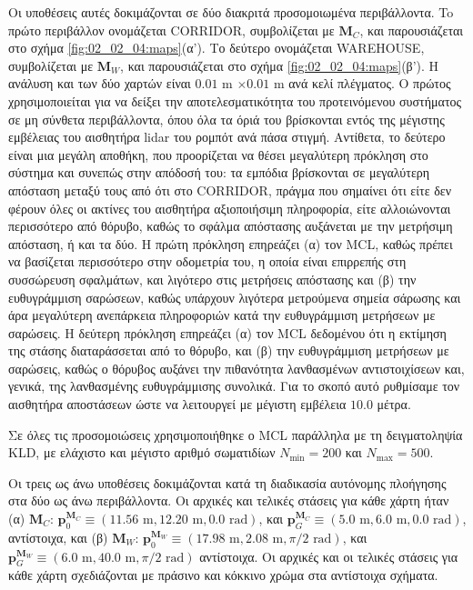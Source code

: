 Οι υποθέσεις αυτές δοκιμάζονται σε δύο διακριτά προσομοιωμένα περιβάλλοντα. To
πρώτο περιβάλλον ονομάζεται CORRIDOR, συμβολίζεται με $\bm{M}_C$, και
παρουσιάζεται στο σχήμα \ref{fig:02_02_04:maps}(α'). Το δεύτερο ονομάζεται
WAREHOUSE, συμβολίζεται με $\bm{M}_W$, και παρουσιάζεται στο σχήμα
\ref{fig:02_02_04:maps}(β'). Η ανάλυση και των δύο χαρτών είναι $0.01$ m
$\times0.01$ m ανά κελί πλέγματος. Ο πρώτος χρησιμοποιείται για να δείξει την
αποτελεσματικότητα του προτεινόμενου συστήματος σε μη σύνθετα περιβάλλοντα,
όπου όλα τα όριά του βρίσκονται εντός της μέγιστης εμβέλειας του αισθητήρα
lidar του ρομπότ ανά πάσα στιγμή.  Αντίθετα, το δεύτερο είναι μια μεγάλη
αποθήκη, που προορίζεται να θέσει μεγαλύτερη πρόκληση στο σύστημα και συνεπώς
στην απόδοσή του: τα εμπόδια βρίσκονται σε μεγαλύτερη απόσταση μεταξύ τους από
ότι στο CORRIDOR, πράγμα που σημαίνει ότι είτε δεν φέρουν όλες οι ακτίνες του
αισθητήρα αξιοποιήσιμη πληροφορία, είτε αλλοιώνονται περισσότερο από θόρυβο,
καθώς το σφάλμα απόστασης αυξάνεται με την μετρήσιμη απόσταση, ή και τα δύο. Η
πρώτη πρόκληση επηρεάζει (α) τον MCL, καθώς πρέπει να βασίζεται περισσότερο
στην οδομετρία του, η οποία είναι επιρρεπής στη συσσώρευση σφαλμάτων, και
λιγότερο στις μετρήσεις απόστασης και (β) την ευθυγράμμιση σαρώσεων, καθώς
υπάρχουν λιγότερα μετρούμενα σημεία σάρωσης και άρα μεγαλύτερη ανεπάρκεια
πληροφοριών κατά την ευθυγράμμιση μετρήσεων με σαρώσεις. Η δεύτερη πρόκληση
επηρεάζει (α) τον MCL δεδομένου ότι η εκτίμηση της στάσης διαταράσσεται από το
θόρυβο, και (β) την ευθυγράμμιση μετρήσεων με σαρώσεις, καθώς ο θόρυβος αυξάνει
την πιθανότητα λανθασμένων αντιστοιχίσεων και, γενικά, της λανθασμένης
ευθυγράμμισης συνολικά. Για το σκοπό αυτό ρυθμίσαμε τον αισθητήρα αποστάσεων
ώστε να λειτουργεί με μέγιστη εμβέλεια $10.0$ μέτρα.

Σε όλες τις προσομοιώσεις χρησιμοποιήθηκε ο MCL παράλληλα με τη δειγματοληψία
KLD, με ελάχιστο και μέγιστο αριθμό σωματιδίων $N_{\min}=200$ και
$N_{\max}=500$.

Οι τρεις ως άνω υποθέσεις δοκιμάζονται κατά τη διαδικασία αυτόνομης πλοήγησης
στα δύο ως άνω περιβάλλοντα. Οι αρχικές και τελικές στάσεις για κάθε χάρτη ήταν
(α) $\bm{M}_C$:
$\bm{p}_0^{\bm{M}_C} \equiv (11.56\text{ m}, 12.20\text{ m}, 0.0 \text{ rad})$,
και $\bm{p}_G^{\bm{M}_C} \equiv (5.0 \text{ m}, 6.0 \text{ m}, 0.0 \text{ rad})$,
αντίστοιχα, και
(β) $\bm{M}_W$:
$\bm{p}_0^{\bm{M}_W} \equiv (17.98 \text{ m}, 2.08 \text{ m}, \pi/2 \text{ rad})$,
και $\bm{p}_G^{\bm{M}_W} \equiv (6.0 \text{ m}, 40.0 \text{ m}, \pi/2 \text{ rad})$
αντίστοιχα. Οι αρχικές και οι τελικές στάσεις για κάθε χάρτη σχεδιάζονται με
πράσινο και κόκκινο χρώμα στα αντίστοιχα σχήματα.

